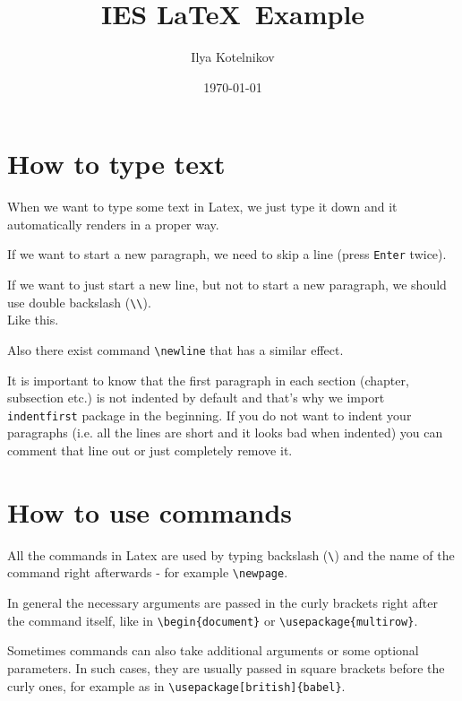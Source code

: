 \documentclass[a4paper, 12pt]{article}
\title{IES \LaTeX\ Example}
\author{Ilya Kotelnikov}
\date{\today}
\begin{document}
\maketitle

\begin{abstract}
    \lipsum[1-1]
\end{abstract}

\newpage

\tableofcontents

\newpage

\section{How to type text}
When we want to type some text in Latex, we just type it down and it automatically renders in a proper way.

If we want to start a new paragraph, we need to skip a line (press \verb|Enter| twice).

If we want to just start a new line, but not to start a new paragraph, we should use double backslash (\verb|\\|).\\
Like this.

Also there exist command \verb|\newline| that has a similar effect.

It is important to know that the first paragraph in each section (chapter, subsection etc.) is not indented by default and that's why we import \verb|indentfirst| package in the beginning. If you do not want to indent your paragraphs (i.e. all the lines are short and it looks bad when indented) you can comment that line out or just completely remove it.
\section{How to use commands}
All the commands in Latex are used by typing backslash (\verb|\|) and the name of the command right afterwards - for example \verb|\newpage|.

In general the necessary arguments are passed in the curly brackets right after the command itself, like in \verb|\begin{document}| or \verb|\usepackage{multirow}|. 

Sometimes commands can also take additional arguments or some optional parameters. In such cases, they are usually passed in square brackets before the curly ones, for example as in \verb|\usepackage[british]{babel}|.
\end{document}
